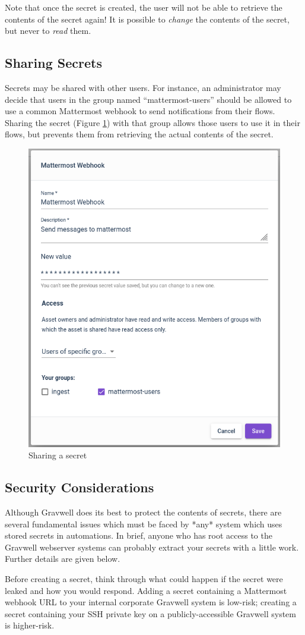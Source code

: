 Note that once the secret is created, the user will not be able to retrieve the contents of the secret again! It is possible to \emph{change} the contents of the secret, but never to \emph{read} them.

\subsection{Sharing Secrets}

Secrets may be shared with other users. For instance, an administrator may decide that users in the group named ``mattermost-users'' should be allowed to use a common Mattermost webhook to send notifications from their flows. Sharing the secret (Figure \ref{fig:secret-sharing}) with that group allows those users to use it in their flows, but prevents them from retrieving the actual contents of the secret.

\begin{figure}
	\includegraphics[width=0.5\linewidth]{images/secret-sharing.png}
	\caption{Sharing a secret}
	\label{fig:secret-sharing}
\end{figure}

\subsection{Security Considerations}

Although Gravwell does its best to protect the contents of secrets, there are several fundamental issues which must be faced by *any* system which uses stored secrets in automations. In brief, anyone who has root access to the Gravwell webserver systems can probably extract your secrets with a little work. Further details are given below.

Before creating a secret, think through what could happen if the secret were leaked and how you would respond. Adding a secret containing a Mattermost webhook URL to your internal corporate Gravwell system is low-risk; creating a secret containing your SSH private key on a publicly-accessible Gravwell system is higher-risk.

